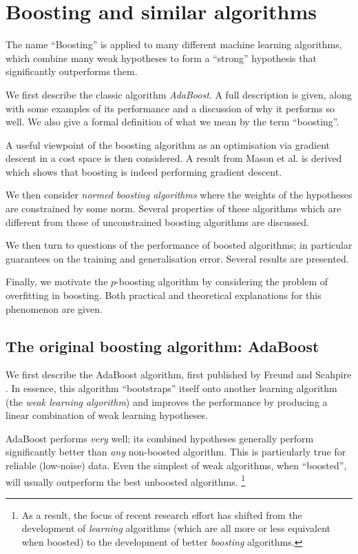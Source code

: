 

\chapter{Boosting and similar algorithms}

The name ``Boosting'' is applied to many different machine learning
algorithms, which combine many weak hypotheses to form a ``strong''
hypothesis that significantly outperforms them.

We first describe the classic algorithm \emph{AdaBoost}.  A full
description is given, along with some examples of its performance and
a discussion of why it performs so well.  We also give a formal
definition of what we mean by the term ``boosting''.

A useful viewpoint of the boosting algorithm as an optimisation via
gradient descent in a cost space is then considered.  A result from
Mason et al. \cite{Mason99} is derived which shows that boosting is
indeed performing gradient descent.

We then consider \emph{normed boosting algorithms} where the
weights of the hypotheses are constrained by some norm.  Several
properties of these algorithms which are different from those of
unconstrained boosting algorithms are discussed.

We then turn to questions of the performance of boosted algorithms; in
particular guarantees on the training and generalisation error.
Several results are presented.

Finally, we motivate the $p$-boosting algorithm by considering the
problem of overfitting in boosting.  Both practical and theoretical
explanations for this phenomenon are given.


\section{The original boosting algorithm: AdaBoost}

We first describe the AdaBoost algorithm, first published by Freund
and Scahpire \cite{Freund96}.  In essence, this algorithm
``bootstraps'' itself onto another learning algorithm (the \emph{weak
learning algorithm}) and improves the performance by producing a
linear combination of weak learning hypotheses.

AdaBoost performs \emph{very} well; its combined hypotheses generally
perform significantly better than \emph{any} non-boosted algorithm.
This is particularly true for reliable (low-noise) data.  Even
the simplest of weak algorithms, when ``boosted'', will usually
outperform the best unboosted algorithms.
\footnote{As a result, the focus of recent research effort has shifted
from the development of \emph{learning} algorithms (which are all more 
or less equivalent when boosted) to the development of better
\emph{boosting} algorithms.}

